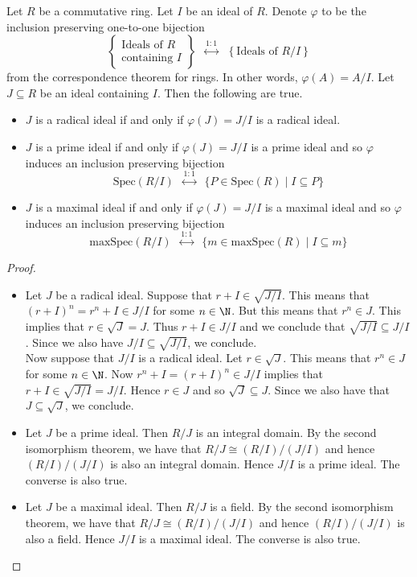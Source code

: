 \documentclass[a4paper]{article}
\begin{document}
\begin{thm}{}{} Let $R$ be a commutative ring. Let $I$ be an ideal of $R$. Denote $\varphi$ to be the inclusion preserving one-to-one bijection $$\left\{\substack{\text{Ideals of }R\\\text{containing }I}\right\}\;\;\overset{1:1}{\longleftrightarrow}\;\;\left\{\text{Ideals of }R/I\right\}$$ from the correspondence theorem for rings. In other words, $\varphi(A)=A/I$. Let $J\subseteq R$ be an ideal containing $I$. Then the following are true. 
\begin{itemize}
\item $J$ is a radical ideal if and only if $\varphi(J)=J/I$ is a radical ideal. 
\item $J$ is a prime ideal if and only if $\varphi(J)=J/I$ is a prime ideal and so $\varphi$ induces an inclusion preserving bijection $$\text{Spec}(R/I)\;\;\overset{1:1}{\longleftrightarrow}\;\;\{P\in\text{Spec}(R)\;|\;I\subseteq P\}$$
\item $J$ is a maximal ideal if and only if $\varphi(J)=J/I$ is a maximal ideal and so $\varphi$ induces an inclusion preserving bijection $$\text{maxSpec}(R/I)\;\;\overset{1:1}{\longleftrightarrow}\;\;\{m\in\text{maxSpec}(R)\;|\;I\subseteq m\}$$
\end{itemize} 
\begin{proof}\\
\begin{itemize}
\item Let $J$ be a radical ideal. Suppose that $r+I\in\sqrt{J/I}$. This means that $(r+I)^n=r^n+I\in J/I$ for some $n\in\N$. But this means that $r^n\in J$. This implies that $r\in\sqrt{J}=J$. Thus $r+I\in J/I$ and we conclude that $\sqrt{J/I}\subseteq J/I$. Since we also have $J/I\subseteq\sqrt{J/I}$, we conclude. \\

Now suppose that $J/I$ is a radical ideal. Let $r\in\sqrt{J}$. This means that $r^n\in J$ for some $n\in\N$. Now $r^n+I=(r+I)^n\in J/I$ implies that $r+I\in\sqrt{J/I}=J/I$. Hence $r\in J$ and so $\sqrt{J}\subseteq J$. Since we also have that $J\subseteq\sqrt{J}$, we conclude. 

\item Let $J$ be a prime ideal. Then $R/J$ is an integral domain. By the second isomorphism theorem, we have that $R/J\cong(R/I)/(J/I)$ and hence $(R/I)/(J/I)$ is also an integral domain. Hence $J/I$ is a prime ideal. The converse is also true. 

\item Let $J$ be a maximal ideal. Then $R/J$ is a field. By the second isomorphism theorem, we have that $R/J\cong(R/I)/(J/I)$ and hence $(R/I)/(J/I)$ is also a field. Hence $J/I$ is a maximal ideal. The converse is also true. 
\end{itemize}
\end{proof}
\end{thm}
\end{document}
